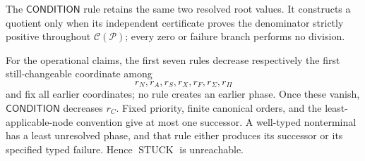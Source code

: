 The \(\mathsf{CONDITION}\) rule retains the same two resolved root values.  It constructs a quotient only when its independent certificate proves the denominator strictly positive throughout \(\mathcal C(\mathcal P)\); every zero or failure branch performs no division.

For the operational claims, the first seven rules decrease respectively the first still-changeable coordinate among
\[
r_N,r_A,r_S,r_X,r_F,r_\Sigma,r_\Pi
\]
and fix all earlier coordinates; no rule creates an earlier phase.  Once these vanish, \(\mathsf{CONDITION}\) decreases \(r_C\).  Fixed priority, finite canonical orders, and the least-applicable-node convention give at most one successor.  A well-typed nonterminal has a least unresolved phase, and that rule either produces its successor or its specified typed failure.  Hence \(\operatorname{STUCK}\) is unreachable.